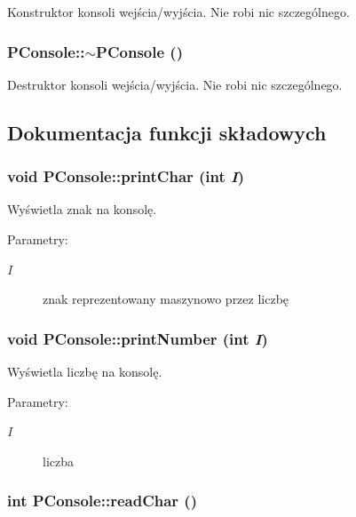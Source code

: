 Konstruktor konsoli wejścia/wyjścia. Nie robi nic szczególnego. \hypertarget{classPConsole_c4a28c9ee5bfd46977b4339672212aca}{
\subsubsection[{$\sim$PConsole}]{\setlength{\rightskip}{0pt plus 5cm}PConsole::$\sim$PConsole ()}}
\label{classPConsole_c4a28c9ee5bfd46977b4339672212aca}


Destruktor konsoli wejścia/wyjścia. Nie robi nic szczególnego. 

\subsection{Dokumentacja funkcji składowych}
\hypertarget{classPConsole_1c0c7c5be680cdb2e456e3e34798c7a6}{
\subsubsection[{printChar}]{\setlength{\rightskip}{0pt plus 5cm}void PConsole::printChar (int {\em I})}}
\label{classPConsole_1c0c7c5be680cdb2e456e3e34798c7a6}


Wyświetla znak na konsolę. \begin{Desc}
\item[Parametry:]
\begin{description}
\item[{\em I}]znak reprezentowany maszynowo przez liczbę \end{description}
\end{Desc}
\hypertarget{classPConsole_744226ceb9724625cadf1124a2b87f55}{
\subsubsection[{printNumber}]{\setlength{\rightskip}{0pt plus 5cm}void PConsole::printNumber (int {\em I})}}
\label{classPConsole_744226ceb9724625cadf1124a2b87f55}


Wyświetla liczbę na konsolę. \begin{Desc}
\item[Parametry:]
\begin{description}
\item[{\em I}]liczba \end{description}
\end{Desc}
\hypertarget{classPConsole_5bf368ed172de8c7e8221973b3c613c3}{
\subsubsection[{readChar}]{\setlength{\rightskip}{0pt plus 5cm}int PConsole::readChar ()}}
\label{classPConsole_5bf368ed172de8c7e8221973b3c613c3}


